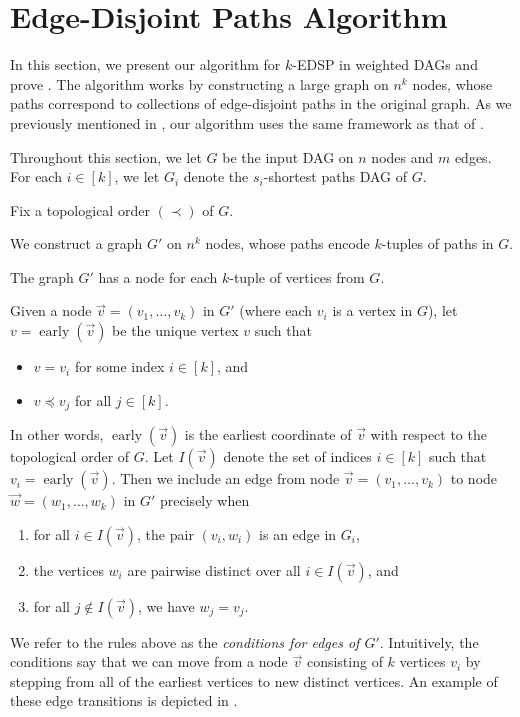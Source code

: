 \documentclass[11pt]{article}
\DeclareMathOperator{\early}{early}
\theoremstyle{definition}
\begin{document}
\section{Edge-Disjoint Paths Algorithm}\label{sec:edge}

In this section, we present our algorithm for \textsf{$k$-EDSP} in weighted DAGs and prove . 
The algorithm works by constructing a large graph on $n^k$ nodes, whose paths correspond to collections of edge-disjoint paths in the original graph.
As we previously mentioned in , our algorithm uses the same framework as that of \cite{FortuneHopcroftWyllie1980}.

Throughout this section, we let $G$ be the input DAG on $n$ nodes and $m$ edges.
For each $i\in [k]$, we let $G_i$ denote the $s_i$-shortest paths DAG of $G$.




    Fix a topological order $(\prec)$ of $G$.
    
    We construct a graph $G'$ on $n^k$ nodes, whose paths encode $k$-tuples of paths in $G$.

    The graph $G'$ has a node for each $k$-tuple of vertices from $G$.

    Given a node $\vec{v} = (v_1, \dots, v_k)$ in $G'$ (where each $v_i$ is a vertex in $G$), let $v = \early(\vec{v})$ be the unique vertex $v$ such that 
        \begin{itemize}
            \item $v = v_i$ for some index $i\in [k]$, and 
            \item $v\preceq v_j$ for all $j\in [k]$.
        \end{itemize}
    In other words, $\early(\vec{v})$ is the earliest coordinate of $\vec{v}$ with respect to the topological order of $G$.
    Let $I(\vec{v})$ denote the set of indices $i\in [k]$ such that $v_i = \early(\vec{v})$.
    Then we include an edge from node $\vec{v} = (v_1, \dots, v_k)$ to node $\vec{w} = (w_1,\dots, w_k)$ in $G'$ precisely when 

    \begin{enumerate}
        \item for all $i\in I(\vec{v})$, the pair $(v_i,w_i)$ is an edge in $G_i$,
        \item the vertices $w_i$ are pairwise distinct over all $i\in I(\vec{v})$, and 
        \item for all $j\not\in I(\vec{v})$, we have $w_j = v_j$.
    \end{enumerate}
        We refer to the rules above as the \emph{conditions for edges of $G'$}.
    Intuitively, the conditions say that we can move from a node $\vec{v}$ consisting of $k$ vertices $v_i$ by stepping from all of the earliest vertices to new distinct vertices.
    An example of these edge transitions is depicted in .
\end{document}
